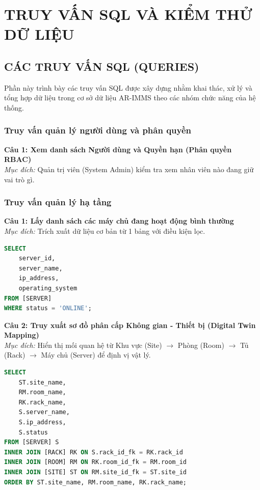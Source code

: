 \section{TRUY VẤN SQL VÀ KIỂM THỬ DỮ LIỆU}

\subsection{CÁC TRUY VẤN SQL (QUERIES)}
Phần này trình bày các truy vấn SQL được xây dựng nhằm khai thác, xử lý và tổng hợp dữ liệu trong cơ sở dữ liệu AR-IMMS theo các nhóm chức năng của hệ thống.

\subsubsection{Truy vấn quản lý người dùng và phân quyền}
\noindent \textbf{Câu 1: Xem danh sách Người dùng và Quyền hạn (Phân quyền RBAC)} \\
\textit{Mục đích:} Quản trị viên (System Admin) kiểm tra xem nhân viên nào đang giữ vai trò gì.

\subsubsection{Truy vấn quản lý hạ tầng}
\noindent \textbf{Câu 1: Lấy danh sách các máy chủ đang hoạt động bình thường} \\
\textit{Mục đích:} Trích xuất dữ liệu cơ bản từ 1 bảng với điều kiện lọc.
\begin{lstlisting}[language=SQL]
SELECT
    server_id,
    server_name,
    ip_address,
    operating_system
FROM [SERVER]
WHERE status = 'ONLINE';
\end{lstlisting}

\noindent \textbf{Câu 2: Truy xuất sơ đồ phân cấp Không gian - Thiết bị (Digital Twin Mapping)} \\
\textit{Mục đích:} Hiển thị mối quan hệ từ Khu vực (Site) $\rightarrow$ Phòng (Room) $\rightarrow$ Tủ (Rack) $\rightarrow$ Máy chủ (Server) để định vị vật lý.
\begin{lstlisting}[language=SQL]
SELECT
    ST.site_name,
    RM.room_name,
    RK.rack_name,
    S.server_name,
    S.ip_address,
    S.status
FROM [SERVER] S
INNER JOIN [RACK] RK ON S.rack_id_fk = RK.rack_id
INNER JOIN [ROOM] RM ON RK.room_id_fk = RM.room_id
INNER JOIN [SITE] ST ON RM.site_id_fk = ST.site_id
ORDER BY ST.site_name, RM.room_name, RK.rack_name;
\end{lstlisting}

